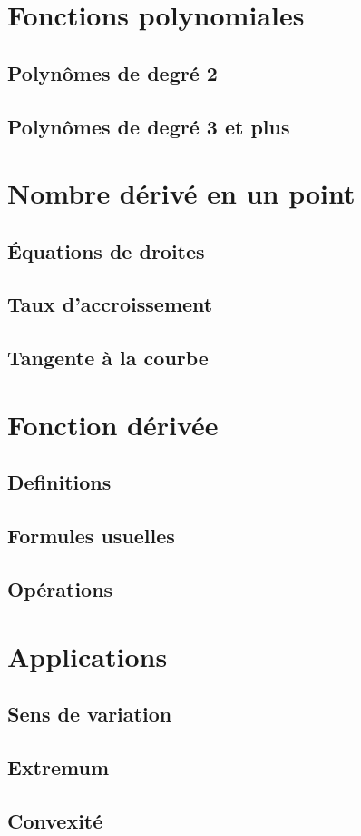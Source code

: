 \documentclass[11pt]{article}
\begin{document}
\section{Fonctions polynomiales}

\subsection{Polynômes de degré 2}

\subsection{Polynômes de degré 3 et plus}

\section{Nombre dérivé en un point}

\subsection{Équations de droites}

\subsection{Taux d'accroissement}

\subsection{Tangente à la courbe}

\section{Fonction dérivée}

\subsection{Definitions}

\subsection{Formules usuelles}

\subsection{Opérations}

\section{Applications}

\subsection{Sens de variation}

\subsection{Extremum}

\subsection{Convexité}
\end{document}
